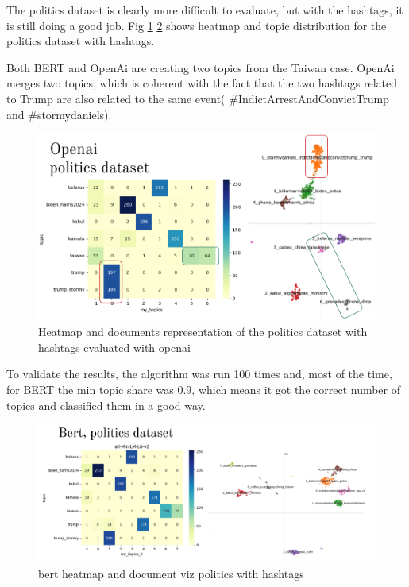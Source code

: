 The politics dataset is clearly more difficult to evaluate, but with the hashtags, it is still doing a good job. Fig \ref{fig:openai_heat_docs_politics_hash} \ref{fig:bert politics with hashtags} shows heatmap and topic distribution for the politics dataset with hashtags.

 Both BERT and OpenAi are creating two topics from the Taiwan case. OpenAi merges two topics, which is coherent with the fact that the two hashtags related to Trump are also related to the same event( \#IndictArrestAndConvictTrump and \#stormydaniels). 

\begin{figure}
    \centering
    \includegraphics[width=1\linewidth]{Chapter4/figures/heatmaps_documents_openai.png}
    \caption{Heatmap and documents representation of the politics dataset with hashtags evaluated with openai}
    \label{fig:openai_heat_docs_politics_hash}
\end{figure}

To validate the results, the algorithm was run 100 times and, most of the time, for BERT the min topic share was 0.9, which means it got the correct number of topics and classified them in a good way.

\begin{figure}
    \centering
    \includegraphics[width=1\linewidth]{Chapter4/figures/heatmaps_docs_bert.png}
    \caption{bert heatmap and document viz politics with hashtags}
    \label{fig:bert politics with hashtags}
\end{figure}

